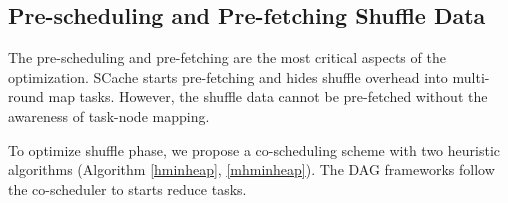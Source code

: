 {\color{blue}
\subsection{Pre-scheduling and Pre-fetching Shuffle Data}
The pre-scheduling and pre-fetching are the most critical aspects of the optimization.
SCache starts pre-fetching and hides shuffle overhead into multi-round map tasks.
However, the shuffle data cannot be pre-fetched without the awareness of task-node mapping.

To optimize shuffle phase, we propose a co-scheduling scheme with two heuristic algorithms (Algorithm \ref{hminheap}, \ref{mhminheap}). 
The DAG frameworks follow the co-scheduler to starts reduce tasks.
}

